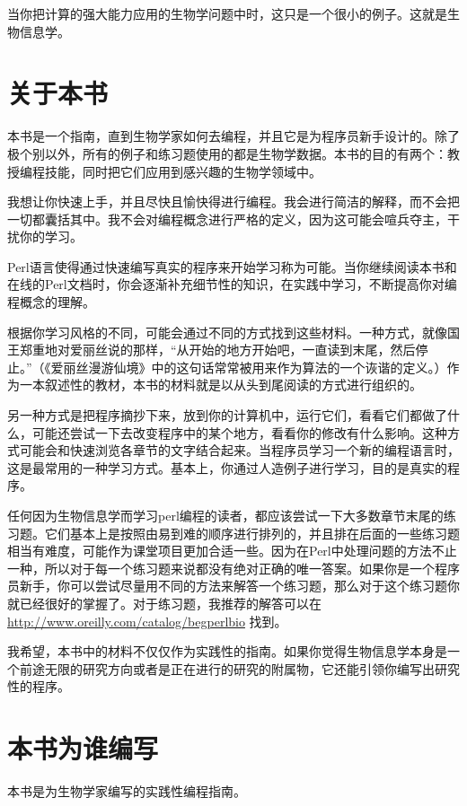 当你把计算的强大能力应用的生物学问题中时，这只是一个很小的例子。这就是生物信息学。

\section*{关于本书}
本书是一个指南，直到生物学家如何去编程，并且它是为程序员新手设计的。除了极个别以外，所有的例子和练习题使用的都是生物学数据。本书的目的有两个：教授编程技能，同时把它们应用到感兴趣的生物学领域中。

我想让你快速上手，并且尽快且愉快得进行编程。我会进行简洁的解释，而不会把一切都囊括其中。我不会对编程概念进行严格的定义，因为这可能会喧兵夺主，干扰你的学习。

Perl语言使得通过快速编写真实的程序来开始学习称为可能。当你继续阅读本书和在线的Perl文档时，你会逐渐补充细节性的知识，在实践中学习，不断提高你对编程概念的理解。

根据你学习风格的不同，可能会通过不同的方式找到这些材料。一种方式，就像国王郑重地对爱丽丝说的那样，“从开始的地方开始吧，一直读到末尾，然后停止。”（《爱丽丝漫游仙境》中的这句话常常被用来作为算法的一个诙谐的定义。）作为一本叙述性的教材，本书的材料就是以从头到尾阅读的方式进行组织的。

另一种方式是把程序摘抄下来，放到你的计算机中，运行它们，看看它们都做了什么，可能还尝试一下去改变程序中的某个地方，看看你的修改有什么影响。这种方式可能会和快速浏览各章节的文字结合起来。当程序员学习一个新的编程语言时，这是最常用的一种学习方式。基本上，你通过人造例子进行学习，目的是真实的程序。

任何因为生物信息学而学习perl编程的读者，都应该尝试一下大多数章节末尾的练习题。它们基本上是按照由易到难的顺序进行排列的，并且排在后面的一些练习题相当有难度，可能作为课堂项目更加合适一些。因为在Perl中处理问题的方法不止一种，所以对于每一个练习题来说都没有绝对正确的唯一答案。如果你是一个程序员新手，你可以尝试尽量用不同的方法来解答一个练习题，那么对于这个练习题你就已经很好的掌握了。对于练习题，我推荐的解答可以在 \href{http://www.oreilly.com/catalog/begperlbio}{http://www.oreilly.com/catalog/begperlbio} 找到。

我希望，本书中的材料不仅仅作为实践性的指南。如果你觉得生物信息学本身是一个前途无限的研究方向或者是正在进行的研究的附属物，它还能引领你编写出研究性的程序。

\section*{本书为谁编写}
本书是为生物学家编写的实践性编程指南。

